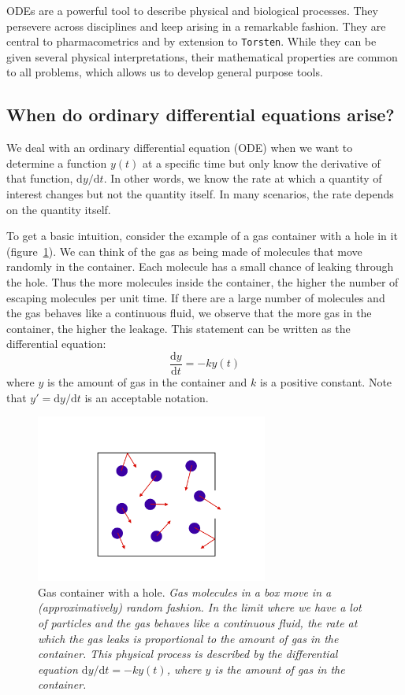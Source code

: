 \documentclass[11pt]{article}
\begin{document}
  ODEs are a powerful tool to describe physical and biological processes.
  They persevere across disciplines and keep arising in a remarkable fashion.
  They are central to pharmacometrics and by extension to \texttt{Torsten}. 
  While they can be given several physical interpretations, their mathematical properties 
  are common to all problems, which allows us to develop general purpose tools.

  \subsection{When do ordinary differential equations arise?}

  We deal with an ordinary differential equation (ODE) when we want to determine a
  function $y(t)$ at a specific time but only know the derivative of that function, $\mathrm{d}y/\mathrm{d}t$.
  In other words, we know the rate at which a quantity of interest changes but not the quantity 
  itself. In many scenarios, the rate depends on the quantity itself.

  To get a basic intuition, consider the example of a gas container with a hole in it  
  (figure~\ref{GasContainer}). We can think of the gas as being made of molecules that move 
  randomly in the container. Each molecule has a small chance of leaking through the hole. Thus
  the more molecules inside the container, the higher the number of escaping molecules per unit
  time. If there are a large number of molecules and the gas behaves like a continuous fluid, we
  observe that the more gas in the container, the higher the leakage. This statement can be 
  written as the differential equation:
  $$ \frac{\mathrm dy}{\mathrm dt} = -ky(t)$$
  where $y$ is the amount of gas in the container and $k$ is a positive constant. Note
  that $y' = \mathrm{d}y/\mathrm{d}t$ is an acceptable notation.

\begin{figure}[!htb]
\begin{center}
\includegraphics[width=3.0in,trim=0in 0in 0 0in]{graphics/GasInBox.png}
\caption{{Gas container with a hole. \textit{Gas molecules in a box move in a (approximatively)
random fashion. In the limit where we have a lot of particles and the gas behaves like a 
continuous fluid, the rate at which the gas leaks is proportional to the amount of gas in the container.
This physical process is described by the differential equation $ \mathrm{d}y/\mathrm{d}t = -ky(t)$, 
where $y$ is the amount of gas in the container.}}}
\label{GasContainer}
\end{center}
\end{figure}
\end{document}
